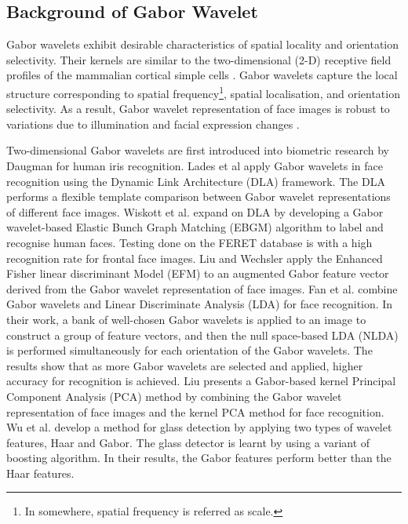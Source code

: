 \documentclass[a4paper,10pt]{article}
\begin{document}
\subsection{Background of Gabor Wavelet}
Gabor wavelets exhibit desirable characteristics of spatial locality and orientation selectivity. Their kernels are similar to the two-dimensional (2-D) receptive field profiles of the mammalian cortical simple cells \cite{Hubel1978}. Gabor wavelets capture the local structure corresponding to spatial frequency\footnote{In somewhere, spatial frequency is referred as scale.}, spatial localisation, and orientation selectivity. As a result, Gabor wavelet representation of face images is robust to variations due to illumination and facial expression changes \cite{Olshausen1996,Rao1995,Schiele2000}. 

Two-dimensional Gabor wavelets are first introduced into biometric research by Daugman \cite{Daugman1993} for human iris recognition. Lades et al \cite{Lades1993} apply Gabor wavelets in face recognition using the Dynamic Link Architecture (\mbox{DLA}) framework. The DLA performs a flexible template comparison between Gabor wavelet representations of different face images. Wiskott et al. \cite{Wiskott1997} expand on DLA by developing a Gabor wavelet-based Elastic Bunch Graph Matching (\mbox{EBGM}) algorithm to label and recognise human faces. Testing done on the \mbox{FERET} database \cite{Phillips2000} is with a high recognition rate for frontal face images. Liu and Wechsler \cite{Liu2002} apply the Enhanced Fisher linear discriminant Model (\mbox{EFM}) to an augmented Gabor feature vector derived from the Gabor wavelet representation of face images. Fan et al. \cite{Fan2004} combine Gabor wavelets and Linear Discriminate Analysis (\mbox{LDA}) for face recognition. In their work, a bank of well-chosen Gabor wavelets is applied to an image to construct a group of feature vectors, and then the null space-based LDA (NLDA) is performed simultaneously for each orientation of the Gabor wavelets. The results show that as more Gabor wavelets are selected and applied, higher accuracy for recognition is achieved. Liu \cite{Liu2004} presents a Gabor-based kernel Principal Component Analysis (PCA) method by combining the Gabor wavelet representation of face images and the kernel PCA method for face recognition. Wu et al. \cite{Wu2004} develop a method for glass detection by applying two types of wavelet features, Haar and Gabor. The glass detector is learnt by using a variant of boosting algorithm. In their results, the Gabor features perform better than the Haar features.
\end{document}
